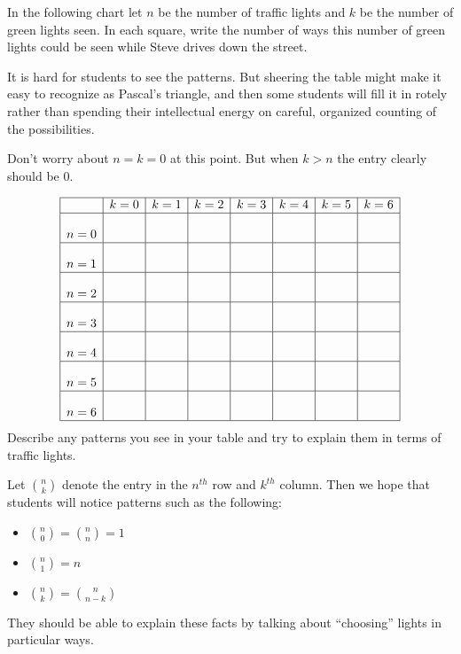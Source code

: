 \documentclass[nooutcomes]{ximera}
\begin{document}
\begin{problem} 
In the following chart let $n$ be the number of traffic
lights and $k$ be  the number of green lights seen. In each square, write the number of ways this number of green lights could be seen while Steve drives down the street.
\newpage

\begin{teachingnote}
It is hard for students to see the patterns.  But sheering the table might make it easy to recognize as Pascal's triangle, and then some students will fill it in rotely rather than spending their intellectual energy on careful, organized counting of the possibilities.  

Don't worry about $n = k = 0$ at this point.  But when $k > n$ the entry clearly should be $0$. 
\end{teachingnote}
\[
\begin{array}{|c|c|c|c|c|c|c|c|}
    \hline
          & k=0 & k=1 & k=2 & k=3 & k=4 & k=5 & k = 6\\
    \hline
    n=0 &\rule[0mm]{0mm}{7mm}&       &       &       &       &   &   \\
    \hline
    n=1 &\rule[0mm]{0mm}{7mm}  &       &       &       &       &   &   \\
    \hline
    n=2 & \rule[0mm]{0mm}{7mm} &     &     &       &       &    &  \\
    \hline
    n=3 &\rule[0mm]{0mm}{7mm}       &       &       &       &       &   &   \\
    \hline
    n=4 & \rule[0mm]{0mm}{7mm}      &       &       &       &       &   &   \\
    \hline
    n=5 &\rule[0mm]{0mm}{7mm}       &       &       &       &       &   &   \\
    \hline
    n=6 &\rule[0mm]{0mm}{7mm}       &       &       &       &       &   &   \\
    \hline
\end{array}
\]
Describe any patterns you see in your table and try to explain them in
terms of traffic lights.
\begin{teachingnote}
Let $\binom{n}{k}$ denote the entry in the $n^{th}$ row and $k^{th}$ column.  Then we hope that students will notice patterns such as the following: 
\begin{itemize}
\item $\binom{n}{0} = \binom{n}{n} = 1$
\item $\binom{n}{1} = n$
\item $\binom{n}{k} = \binom{n}{n-k}$
\end{itemize}
They should be able to explain these facts by talking about ``choosing'' lights in particular ways.  
\end{teachingnote}
\end{problem}
\end{document}
